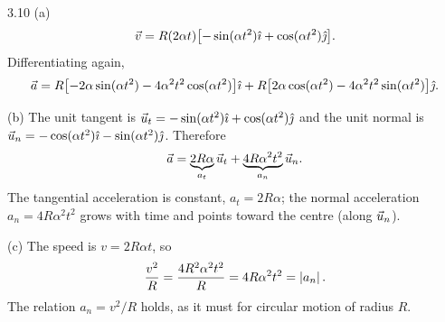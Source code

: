 \begin{tabletworkspace}[6.5cm]
\end{tabletworkspace}

\begin{solution}{3.10}
(a)
\[
\vec v=R(2\alpha t)\bigl[-\sin(\alpha t^2)\hat{\imath}+\cos(\alpha t^2)\hat{\jmath}\bigr].
\]
Differentiating again,
\[
\vec a=R\bigl[-2\alpha\sin(\alpha t^2)-4\alpha^2t^2\cos(\alpha t^2)\bigr]\hat{\imath}
+R\bigl[2\alpha\cos(\alpha t^2)-4\alpha^2t^2\sin(\alpha t^2)\bigr]\hat{\jmath}.
\]

(b) The unit tangent is
$\vec{u}_t=-\sin(\alpha t^2)\hat{\imath}+\cos(\alpha t^2)\hat{\jmath}$ and the unit normal is
$\vec{u}_n=-\cos(\alpha t^2)\hat{\imath}-\sin(\alpha t^2)\hat{\jmath}$. Therefore
\[
\vec a=\underbrace{2R\alpha}_{a_t}\vec{u}_t
+\underbrace{4R\alpha^2t^2}_{a_n}\vec{u}_n.
\]
The tangential acceleration is constant, $a_t=2R\alpha$; the normal acceleration
$a_n=4R\alpha^2t^2$ grows with time and points toward the centre (along $\vec{u}_n$).

(c) The speed is $v=2R\alpha t$, so
\[
\frac{v^2}{R}=\frac{4R^2\alpha^2t^2}{R}=4R\alpha^2t^2=\left\lvert a_n \right\rvert.
\]
The relation $a_n=v^2/R$ holds, as it must for circular motion of radius $R$.
\end{solution}

